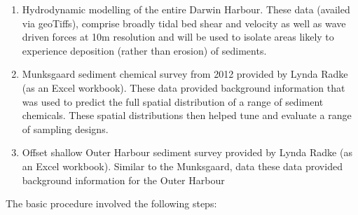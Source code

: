 \documentclass[a4paper]{article}
\begin{document}
\begin{enumerate}
\def\labelenumi{\arabic{enumi}.}
\item
  Hydrodynamic modelling of the entire Darwin Harbour. These data
  (availed via geoTiffs), comprise broadly tidal bed shear and velocity
  as well as wave driven forces at 10m resolution and will be used to
  isolate areas likely to experience deposition (rather than erosion) of
  sediments.
\item
  Munksgaard sediment chemical survey from 2012 provided by Lynda Radke
  (as an Excel workbook). These data provided background information
  that was used to predict the full spatial distribution of a range of
  sediment chemicals. These spatial distributions then helped tune and
  evaluate a range of sampling designs.
\item
  Offset shallow Outer Harbour sediment survey provided by Lynda Radke
  (as an Excel workbook). Similar to the Munksgaard, data these data
  provided background information for the Outer Harbour
\end{enumerate}

The basic procedure involved the following steps:
\end{document}
